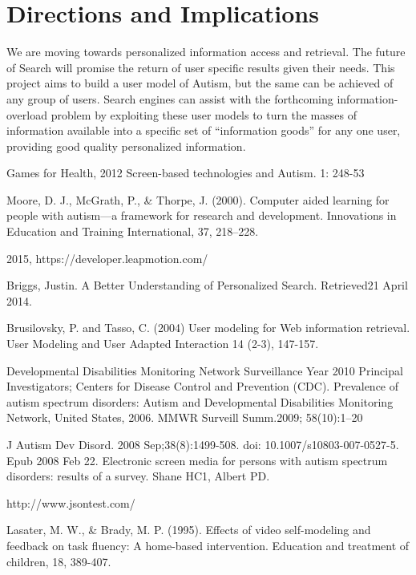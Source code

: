 \documentclass[10pt]{article}
\begin{document}
\section{Directions and Implications}\label{future}
We are moving towards personalized information access and retrieval. The future of Search will promise the return of user specific results given their needs. This project aims to build a user model of Autism, but the same can be achieved of any group of users. Search engines can assist with the forthcoming information-overload problem by exploiting these user models to turn the masses of information available into a specific set of “information goods” for any one user, providing good quality personalized information.

\begin{thebibliography}{100}

 Games for Health, 2012 Screen-based technologies and Autism. 1: 248-53

Moore, D. J., McGrath, P., \& Thorpe, J. (2000). Computer aided learning for people with autism—a framework for research and development. Innovations in Education and Training International, 37, 218–228.

 2015, https://developer.leapmotion.com/

Briggs, Justin. A Better Understanding of Personalized Search. Retrieved21 April 2014.


Brusilovsky, P. and Tasso, C. (2004) User modeling for Web information retrieval. User Modeling and User Adapted Interaction 14 (2-3), 147-157.


Developmental Disabilities Monitoring Network Surveillance Year 2010 Principal Investigators; Centers for Disease Control and Prevention (CDC). Prevalence of autism spectrum disorders: Autism and Developmental Disabilities Monitoring Network, United States, 2006. MMWR Surveill Summ.2009; 58(10):1–20


J Autism Dev Disord. 2008 Sep;38(8):1499-508. doi: 10.1007/s10803-007-0527-5. Epub 2008 Feb 22. Electronic screen media for persons with autism spectrum disorders: results of a survey.
Shane HC1, Albert PD.

http://www.jsontest.com/

Lasater, M. W., \& Brady, M. P. (1995). Effects of video self-modeling and feedback on task fluency: A home-based intervention. Education and treatment of children, 18, 389-407.



\end{thebibliography}
\end{document}
